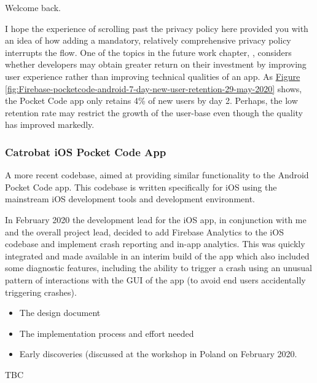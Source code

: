 

Welcome back. 

I hope the experience of scrolling past the privacy policy here provided you with an idea of how adding a mandatory, relatively comprehensive privacy policy interrupts the flow. One of the topics in the future work chapter, \href{enhancing-quality-vs-enhancing-ux}{\textit{}}, considers whether developers may obtain greater return on their investment by improving user experience rather than improving technical qualities of an app. As \href{enhancing-quality-vs-enhancing-ux}{Figure \ref{fig:Firebase-pocketcode-android-7-day-new-user-retention-29-may-2020}} shows, the Pocket Code app only retains 4\% of new users by day 2. Perhaps, the low retention rate may restrict the growth of the user-base even though the quality has improved markedly.

\subsubsection{Catrobat iOS Pocket Code App}
A more recent codebase, aimed at providing similar functionality to the Android Pocket Code app. This codebase is written specifically for iOS using the mainstream iOS development tools and development environment. 

In February 2020 the development lead for the iOS app, in conjunction with me and the overall project lead, decided to add Firebase Analytics to the iOS codebase and implement crash reporting and in-app analytics. This was quickly integrated and made available in an interim build of the app which also included some diagnostic features, including the ability to trigger a crash using an unusual pattern of interactions with the GUI of the app (to avoid end users accidentally triggering crashes).


\begin{itemize}
    \item The design document
    \item The implementation process and effort needed
    \item Early discoveries (discussed at the workshop in Poland on  February 2020.
\end{itemize}
TBC

